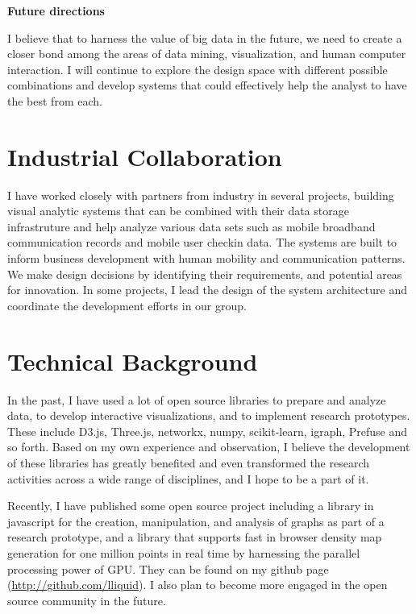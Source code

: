 \documentclass[11pt,a4paper,sans]{moderncv} %
\begin{document}
\textbf{Future directions}

I believe that to harness the value of big data in the future, we need to create a closer bond among the areas of data mining, visualization, and human computer interaction. I will continue to explore the design space with different possible combinations and develop systems that could effectively help the analyst to have the best from each.

\clearpage

\section{Industrial Collaboration}

I have worked closely with partners from industry in several projects, building visual analytic systems that can be combined with their data storage infrastruture and help analyze various data sets such as  mobile broadband communication records and mobile user checkin data. The systems are built to inform business development with human mobility and communication patterns. We make design decisions by identifying their requirements, and potential areas for innovation. In some projects, I lead the design of the system architecture and coordinate the development efforts in our group.

\section{Technical Background}

In the past, I have used a lot of open source libraries to prepare and analyze data, to develop interactive visualizations, and to implement research prototypes. These include D3.js, Three.js, networkx, numpy, scikit-learn, igraph, Prefuse and so forth. Based on my own experience and observation, I believe the development of these libraries has greatly benefited and even transformed the research activities across a wide range of disciplines, and I hope to be a part of it.

Recently, I have published some open source project including a library in javascript for the creation, manipulation, and analysis of graphs as part of a research prototype, and a library that supports fast in browser density map generation for one million points in real time by harnessing the parallel processing power of GPU. They can be found on my github page (\href{http://github.com/lliquid}{http://github.com/lliquid}). I also plan to become more engaged in the open source community in the future.
\end{document}
